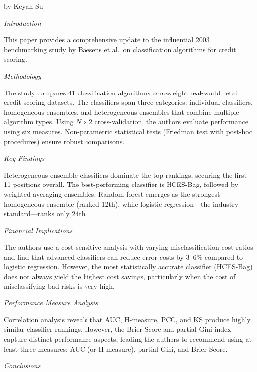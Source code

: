 \documentclass[letterpaper]{article}
\begin{document}
		{\color{deepred} by Keyan Su}
		
		
		\textit{Introduction}
		
		This paper provides a comprehensive update to the influential 2003 benchmarking study by Baesens et al.\ on classification algorithms for credit scoring.
		
		\medskip
		
		\textit{Methodology}
		
		The study compares 41 classification algorithms across eight real-world retail credit scoring datasets. The classifiers span three categories: individual classifiers, homogeneous ensembles, and heterogeneous ensembles that combine multiple algorithm types. Using $N\times 2$ cross-validation, the authors evaluate performance using six measures. Non-parametric statistical tests (Friedman test with post-hoc procedures) ensure robust comparisons.
		
		\medskip
		
		\textit{Key Findings}
		
		Heterogeneous ensemble classifiers dominate the top rankings, securing the first 11 positions overall. The best-performing classifier is HCES-Bag, followed by weighted averaging ensembles. Random forest emerges as the strongest homogeneous ensemble (ranked 12th), while logistic regression---the industry standard---ranks only 24th.
		
		\medskip
		
		\textit{Financial Implications}
		
		The authors use a cost-sensitive analysis with varying misclassification cost ratios and find that advanced classifiers can reduce error costs by 3--6\% compared to logistic regression. However, the most statistically accurate classifier (HCES-Bag) does not always yield the highest cost savings, particularly when the cost of misclassifying bad risks is very high.
		
		\medskip
		
		\textit{Performance Measure Analysis}
		
		Correlation analysis reveals that AUC, H-measure, PCC, and KS produce highly similar classifier rankings. However, the Brier Score and partial Gini index capture distinct performance aspects, leading the authors to recommend using at least three measures: AUC (or H-measure), partial Gini, and Brier Score.
		
		\medskip
		
		\textit{Conclusions}
		
\end{document}
